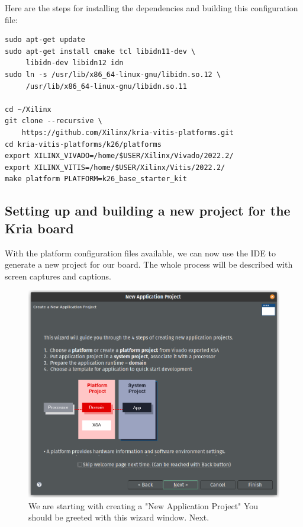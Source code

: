 \documentclass[10pt]{article}
\begin{document}
Here are the steps for installing the dependencies and building this configuration file:

\begin{verbatim}
sudo apt-get update
sudo apt-get install cmake tcl libidn11-dev \
     libidn-dev libidn12 idn
sudo ln -s /usr/lib/x86_64-linux-gnu/libidn.so.12 \
     /usr/lib/x86_64-linux-gnu/libidn.so.11

cd ~/Xilinx
git clone --recursive \
    https://github.com/Xilinx/kria-vitis-platforms.git
cd kria-vitis-platforms/k26/platforms
export XILINX_VIVADO=/home/$USER/Xilinx/Vivado/2022.2/
export XILINX_VITIS=/home/$USER/Xilinx/Vitis/2022.2/
make platform PLATFORM=k26_base_starter_kit
\end{verbatim}

\subsection{Setting up and building a new project for the Kria board}
\label{sec:org7253314}
With the platform configuration files available, we can now use the IDE to generate a
new project for our board. The whole process will be described with screen captures and
captions.

\begin{figure}[htbp]
\centering
\includegraphics[width=.6\textwidth]{./img/vitis_new/project1.png}
\caption{\label{fig:orgde7c495}We are starting with creating a "New Application Project" You should be greeted with this wizard window. Next.}
\end{figure}
\end{document}
